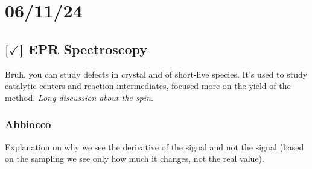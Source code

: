 \section{06/11/24}

\subsection{[$\checkmark$] EPR Spectroscopy}

Bruh, you can study defects in crystal and of short-live species. It's used to study catalytic centers and reaction intermediates, focused more on the yield of the method. \textit{Long discussion about the spin.}

\subsubsection{Abbiocco}

Explanation on why we see the derivative of the signal and not the signal (based on the sampling we see only how much it changes, not the real value).